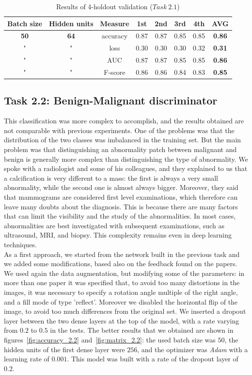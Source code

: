 \documentclass[11pt,a4paper,oneside]{article}
\begin{document}
\begin{table}[h]
\centering
\begin{tabular}{|cccccccc|}
\hline
Batch size & Hidden units & Measure & 1st & 2nd & 3rd & 4th & \textbf{AVG} \\
\hline
\textbf{50} & \textbf{64} & accuracy & 0.87 & 0.87 & 0.85 & 0.85 & \textbf{0.86} \\
" & " & loss & 0.30 & 0.30 & 0.30 & 0.32 & \textbf{0.31} \\
" & " & AUC & 0.87 & 0.87 & 0.85 & 0.85 & \textbf{0.86} \\
" & " & F-score & 0.86 & 0.86 & 0.84 & 0.83 & \textbf{0.85} \\
\hline
\end{tabular}
\caption{Results of 4-holdout validation ($Task\ 2.1$)}
\end{table}



\subsection{Task 2.2: Benign-Malignant discriminator}
This classification was more complex to accomplish, and the results obtained are not comparable with previous experiments. One of the problems was that the distribution of the two classes was imbalanced in the training set. But the main problem was that distinguishing an abnormality patch between malignant and benign is generally more complex than distinguishing the type of abnormality. 
We spoke with a radiologist and some of his colleagues, and they explained to us that a calcification is very different to a mass: the first is always a very small abnormality, while the second one is almost always bigger. Moreover, they said that mammograms are considered first level examinations, which therefore can leave many doubts about the diagnosis. This is because there are many factors that can limit the visibility and the study of the abnormalities. 
In most cases, abnormalities are best investigated with subsequent examinations, such as ultrasound, MRI, and biopsy.
This complexity remains even in deep learning techniques.\\


As a first approach, we started from the network built in the previous task and we added some modifications, based also on the feedback found on the papers.
We used again the data augmentation, but modifying some of the parameters: in more than one paper it was specified that, to avoid too many distortions in the images, it was necessary to specify a rotation angle multiple of the right angle, and a fill mode of type 'reflect'. Moreover we disabled the horizontal flip of the image, to avoid too much differences from the original set.
We inserted a dropout layer between the two dense layers at the top of the model, with a rate varying from $0.2$ to $0.5$ in the tests.
The better results that we obtained are shown in figures~\ref{fig:accuracy_2.2} and~\ref{fig:matrix_2.2}: the used batch size was $50$, the hidden units of the first dense layer were $256$, and the optimizer was \textit{Adam} with a learning rate of $0.001$. This model was built with a rate of the dropout layer of $0.2$.
\end{document}
